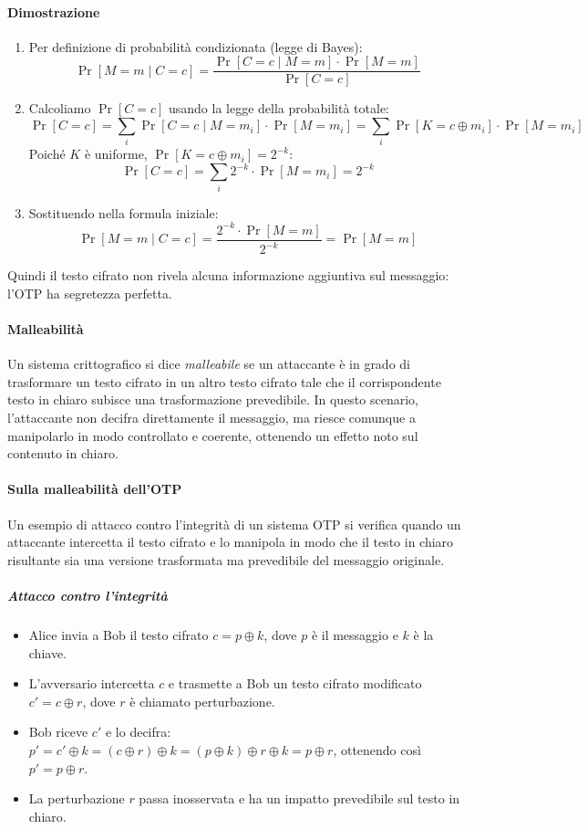 \documentclass{report}
\begin{document}
\paragraph{Dimostrazione}
\begin{enumerate}
    \item Per definizione di probabilità condizionata (legge di Bayes):
    \[
    \Pr[M = m \mid C = c] = \frac{\Pr[C = c \mid M = m] \cdot \Pr[M = m]}{\Pr[C = c]}
    \]
    \item Calcoliamo $\Pr[C = c]$ usando la legge della probabilità totale:
    \[
    \Pr[C = c] = \sum_i \Pr[C = c \mid M = m_i] \cdot \Pr[M = m_i] = \sum_i \Pr[K = c \oplus m_i] \cdot \Pr[M = m_i]
    \]
    Poiché $K$ è uniforme, $\Pr[K = c \oplus m_i] = 2^{-k}$:
    \[
    \Pr[C = c] = \sum_i 2^{-k} \cdot \Pr[M = m_i] = 2^{-k}
    \]
    \item Sostituendo nella formula iniziale:
    \[
    \Pr[M = m \mid C = c] = \frac{2^{-k} \cdot \Pr[M = m]}{2^{-k}} = \Pr[M = m]
    \]
\end{enumerate}

Quindi il testo cifrato non rivela alcuna informazione aggiuntiva sul messaggio: l'OTP ha segretezza perfetta.
\paragraph{Malleabilità}

Un sistema crittografico si dice \textit{malleabile} se un attaccante è in grado di trasformare un testo cifrato in un altro testo cifrato tale che il corrispondente testo in chiaro subisce una trasformazione prevedibile. In questo scenario, l’attaccante non decifra direttamente il messaggio, ma riesce comunque a manipolarlo in modo controllato e coerente, ottenendo un effetto noto sul contenuto in chiaro.

\paragraph{Sulla malleabilità dell'OTP}

Un esempio di attacco contro l'integrità di un sistema OTP si verifica quando un attaccante intercetta il testo cifrato e lo manipola in modo che il testo in chiaro risultante sia una versione trasformata ma prevedibile del messaggio originale.

\subparagraph{Attacco contro l'integrità}
\begin{itemize}
    \item Alice invia a Bob il testo cifrato $c = p \oplus k$, dove $p$ è il messaggio e $k$ è la chiave.
    \item L'avversario intercetta $c$ e trasmette a Bob un testo cifrato modificato $c' = c \oplus r$, dove $r$ è chiamato perturbazione.
    \item Bob riceve $c'$ e lo decifra: $p' = c' \oplus k = (c \oplus r) \oplus k = (p \oplus k) \oplus r \oplus k = p \oplus r$, ottenendo così $p' = p \oplus r$.
    \item La perturbazione $r$ passa inosservata e ha un impatto prevedibile sul testo in chiaro.
\end{itemize}
\end{document}
